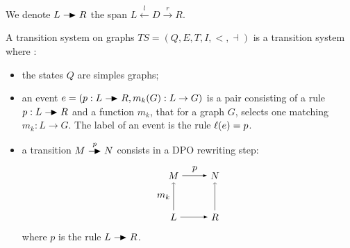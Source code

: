 We denote $L\action R$ the span $L\overset{l}{\leftarrow} D \overset{r}{\rightarrow} R$.

\begin{definition}
  A transition system on graphs $TS = (Q,E,T,I,<,\dashv)$ is a transition system where :
  \begin{itemize}
  \item the states $Q$ are simples graphs;
  \item an event $e=(p:L\action R,m_k(G):L\to G)$ is a pair consisting of a rule $p:L\action R$ and a function $m_k$, that for a graph $G$, selects one matching $m_k :L\to G$. The label of an event is the rule $\ell(e) = p$.
  \item a transition $M\overset{p}{\action} N$ consists in a DPO rewriting step:
    \[
    \begin{tikzpicture} %
      \node (l) at (-1.5,0) {\(L\)};
      \node (r) at (0,0) {\(R\)};
      \node (m) at (-1.5,1.5) {\(M\)};
      \node (n) at (0,1.5) {\(N\)};
      \draw [->] (l) -- node [left,midway] {\(m_k\)}  (m);
      \draw [>=latex, ->] (l) -- (r);
      \draw [>=latex, ->] (m) -- node [above,midway] {\(p\)} (n);
      \draw [->] (r) -- (n);
    \end{tikzpicture}
    \]
    where $p$ is the rule $L\action R$.
  \end{itemize}
\end{definition}
